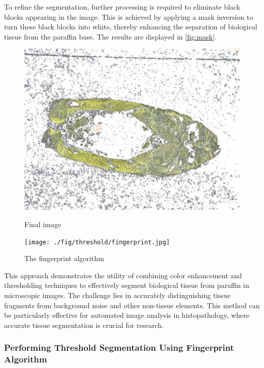 To refine the segmentation, further processing is required to eliminate black blocks appearing in the image. This is achieved by applying a mask inversion to turn these black blocks into white, thereby enhancing the separation of biological tissue from the paraffin base. The results are displayed in \autoref{fig:mask}.

\begin{figure}[H]
    \centering
    \begin{minipage}{0.45\textwidth}
        \centering
        \includegraphics[width=\textwidth]{./fig/threshold/final.jpg}
        \caption{Final image}
        \label{fig:mask}
    \end{minipage}
    \begin{minipage}{0.45\textwidth}
        \centering
        \texttt{[image: ./fig/threshold/fingerprint.jpg]}
        \caption{The fingerprint algorithm}
        \label{fig:fingerprint}
    \end{minipage}
\end{figure}

This approach demonstrates the utility of combining color enhancement and thresholding techniques to effectively segment biological tissue from paraffin in microscopic images. The challenge lies in accurately distinguishing tissue fragments from background noise and other non-tissue elements. This method can be particularly effective for automated image analysis in histopathology, where accurate tissue segmentation is crucial for research.

\subsubsection{Performing Threshold Segmentation Using Fingerprint Algorithm}

